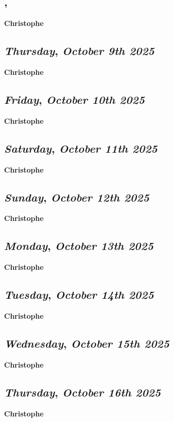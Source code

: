\subsection*{\weekday, \day}
\textbf {Christophe}

\def\day{\textit{October 9th 2025}}
\def\weekday{\textit{Thursday}}
\subsection*{\weekday, \day}
\textbf {Christophe}

\def\day{\textit{October 10th 2025}}
\def\weekday{\textit{Friday}}
\subsection*{\weekday, \day}
\textbf {Christophe}

\def\day{\textit{October 11th 2025}}
\def\weekday{\textit{Saturday}}
\subsection*{\weekday, \day}
\textbf {Christophe}

\def\day{\textit{October 12th 2025}}
\def\weekday{\textit{Sunday}}
\subsection*{\weekday, \day}
\textbf {Christophe}

\def\day{\textit{October 13th 2025}}
\def\weekday{\textit{Monday}}
\subsection*{\weekday, \day}
\textbf {Christophe}

\def\day{\textit{October 14th 2025}}
\def\weekday{\textit{Tuesday}}
\subsection*{\weekday, \day}
\textbf {Christophe}

\def\day{\textit{October 15th 2025}}
\def\weekday{\textit{Wednesday}}
\subsection*{\weekday, \day}
\textbf {Christophe}

\def\day{\textit{October 16th 2025}}
\def\weekday{\textit{Thursday}}
\subsection*{\weekday, \day}
\textbf {Christophe}


